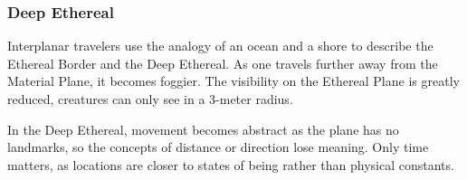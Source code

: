 \subsubsection{Deep Ethereal}
Interplanar travelers use the analogy of an ocean and a shore to describe the Ethereal Border and the Deep Ethereal. As one travels further away from the Material Plane, it becomes foggier. The visibility on the Ethereal Plane is greatly reduced, creatures can only see in a 3-meter radius.

In the Deep Ethereal, movement becomes abstract as the plane has no landmarks, so the concepts of distance or direction lose meaning. Only time matters, as locations are closer to states of being rather than physical constants.

